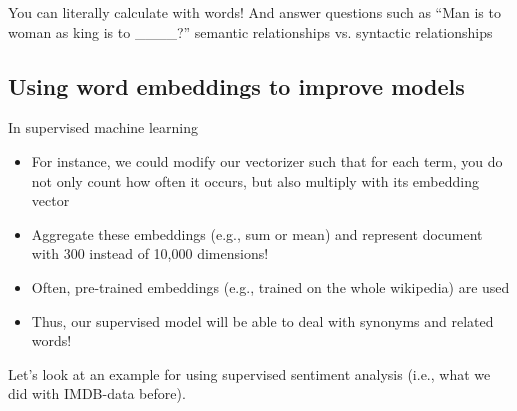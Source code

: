 

\begin{frame}{You can literally calculate with words!}
	And answer questions such as ``Man is to woman as king is to \_\_\_\_?''
	semantic relationships vs. syntactic relationships
\end{frame}




\subsection[Improving models]{Using word embeddings to improve models}


\begin{frame}{In supervised machine learning}
  \begin{itemize}[<+->]
  \item For instance, we could modify our vectorizer such that for each term, you do not only count how often it occurs, but also multiply with its embedding vector
  \item Aggregate these embeddings (e.g., sum or mean) and represent document with 300 instead of 10,000 dimensions!
  \item Often, pre-trained embeddings (e.g., trained on the whole wikipedia) are used
  \item Thus, our supervised model will be able to deal with synonyms and related words!
  \end{itemize}


  
  \pause 
  Let's look at an example for using supervised sentiment analysis (i.e., what we did with IMDB-data before).
  
	
\end{frame}



